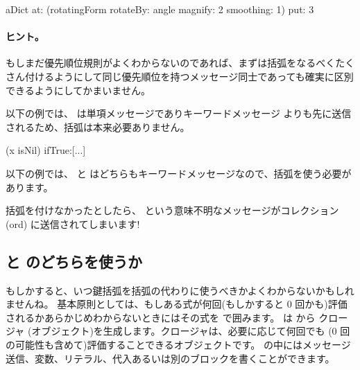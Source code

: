 \documentclass[a4paper,10pt,twoside]{book}
\begin{document}
\begin{code}{}
aDict
   at: (rotatingForm 
          rotateBy: angle	
          magnify: 2 
          smoothing: 1)
   put: 3
\end{code}



\paragraph{ヒント。} もしまだ優先順位規則がよくわからないのであれば、まずは括弧をなるべくたくさん付けるようにして同じ優先順位を持つメッセージ同士であっても確実に区別できるようにしてかまいません。

以下の例では、 は単項メッセージでありキーワードメッセージ  よりも先に送信されるため、括弧は本来必要ありません。
\begin{code}{}
(x isNil)
   ifTrue:[...]
\end{code}

以下の例では、 と  はどちらもキーワードメッセージなので、括弧を使う必要があります。
\noindent
括弧を付けなかったとしたら、 という意味不明なメッセージがコレクション (ord) に送信されてしまいます!

\subsection{\lct{[ ]} と \lct{( )} のどちらを使うか}
もしかすると、いつ鍵括弧を括弧の代わりに使うべきかよくわからないかもしれませんね。
基本原則としては、もしある式が何回(もしかすると 0 回かも)評価されるかあらかじめわからないときにはその式を \ct{[ ]} で囲みます。
 は  から クロージャ (\ie オブジェクト)を生成します。クロージャは、必要に応じて何回でも (0 回の可能性も含めて)評価することできるオブジェクトです。\ct{[ ]} の中にはメッセージ送信、変数、リテラル、代入あるいは別のブロックを書くことができます。
\end{document}
